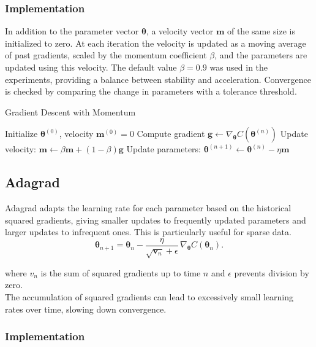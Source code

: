 \documentclass[
 reprint,            %
 amsmath,amssymb,
 aps,
]{revtex4-2}
\begin{document}
\subsubsection{Implementation}

In addition to the parameter vector $\boldsymbol{\theta}$, a velocity vector $\mathbf{m}$ of the same size is initialized to zero. At each iteration the velocity is updated as a moving average of past gradients, scaled by the momentum coefficient $\beta$, and the parameters are updated using this velocity.
The default value $\beta=0.9$ was used in the experiments, providing a balance between stability and acceleration. Convergence is checked by comparing the change in parameters with a tolerance threshold.
\begin{algorithm}[H]
\caption{Gradient Descent with Momentum}
\begin{algorithmic}[1]
\State Initialize $\boldsymbol{\theta}^{(0)}$, velocity $\mathbf{m}^{(0)}=0$
\State Compute gradient $\mathbf{g} \gets \nabla_{\boldsymbol{\theta}} C(\boldsymbol{\theta}^{(n)})$
\State Update velocity: $\mathbf{m} \gets \beta \mathbf{m} + (1-\beta)\mathbf{g}$
\State Update parameters: $\boldsymbol{\theta}^{(n+1)} \gets \boldsymbol{\theta}^{(n)} - \eta \mathbf{m}$
\EndFor
\end{algorithmic}
\end{algorithm}

\subsection{Adagrad}

Adagrad adapts the learning rate for each parameter based on the historical squared gradients, giving smaller updates to frequently updated parameters and larger updates to infrequent ones\cite{hjorthjensen_week37}.
This is particularly useful for sparse data.  
\[
\boldsymbol{\theta}_{n+1} = \boldsymbol{\theta}_n - \frac{\eta}{\sqrt{\boldsymbol{v}_n} + \epsilon} \, \nabla_{\boldsymbol{\theta}} C(\boldsymbol{\theta}_n).
\]

where \(v_n\) is the sum of squared gradients up to time \(n\) and \(\epsilon\) prevents division by zero.  \\

The accumulation of squared gradients can lead to excessively small learning rates over time, slowing down convergence. \cite{goodfellow2016}

\subsubsection{Implementation}
\end{document}
